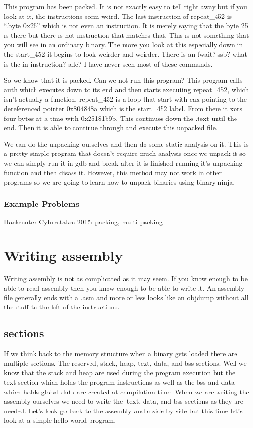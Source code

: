 \documentclass{report}
\begin{document}
This program has been packed.  It is not exactly easy to tell right away but if you look at it, the instructions seem weird.  The last instruction of repeat\_452 is ``.byte 0x25'' which is not even an instruction.  It is merely saying that the byte 25 is there but there is not instruction that matches that.  This is not something that you will see in an ordinary binary.  The more you look at this especially down in the start\_452 it begins to look weirder and weirder.  There is an fwait?  ssb?  what is the in instruction?  adc?  I have never seen most of these commands. 

So we know that it is packed.  Can we not run this program?  This program calls auth which executes down to its end and then starts executing repeat\_452, which isn't actually a function.  repeat\_452 is a loop that start with eax pointing to the dereferenced pointer 0x804848a which is the start\_452 label.  From there it xors four bytes at a time with 0x25181b9b.  This continues down the .text until the end.  Then it is able to continue through and execute this unpacked file.  

We can do the unpacking ourselves and then do some static analysis on it.  This is a pretty simple program that doesn't require much analysis once we unpack it so we can simply run it in gdb and break after it is finished running it's unpacking function and then disass it.  However, this method may not work in other programs so we are going to learn how to unpack binaries using binary ninja.

\subsection{Example Problems}
Hackcenter Cyberstakes 2015: packing, multi-packing


\chapter{Writing assembly}
Writing assembly is not as complicated as it may seem.  If you know enough to be able to read assembly then you know enough to be able to write it.  An assembly file generally ends with a .asm and more or less looks like an objdump without all the stuff to the left of the instructions.

\section{sections}
If we think back to the memory structure when a binary gets loaded there are multiple sections.  The reserved, stack, heap, text, data, and bss sections.  Well we know that the stack and heap are used during the program execution but the text section which holds the program instructions as well as the bss and data which holds global data are created at compilation time.  When we are writing the assembly ourselves we need to write the .text, data, and bss sections as they are needed.  Let's look go back to the assembly and c side by side but this time let's look at a simple hello world program.
\end{document}
